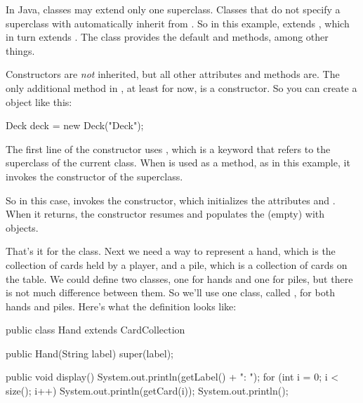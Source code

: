 

In Java, classes may extend only one superclass.
Classes that do not specify a superclass with  automatically inherit from .
So in this example,  extends , which in turn extends .
The  class provides the default  and  methods, among other things.


Constructors are {\em not} inherited, but all other  attributes and methods are.
The only additional method in , at least for now, is a constructor.
So you can create a  object like this:

\begin{code}
Deck deck = new Deck("Deck");
\end{code}

The first line of the constructor uses , which is a keyword that refers to the superclass of the current class.
When  is used as a method, as in this example, it invokes the constructor of the superclass.


So in this case,  invokes the  constructor, which initializes the attributes  and .
When it returns, the  constructor resumes and populates the (empty)  with  objects.

That's it for the  class.
Next we need a way to represent a hand, which is the collection of cards held by a player, and a pile, which is a collection of cards on the table.
We could define two classes, one for hands and one for piles, but there is not much difference between them.
So we'll use one class, called , for both hands and piles.
Here's what the definition looks like:


\begin{code}
public class Hand extends CardCollection {

    public Hand(String label) {
        super(label);
    }

    public void display() {
        System.out.println(getLabel() + ": ");
        for (int i = 0; i < size(); i++) {
            System.out.println(getCard(i));
        }
        System.out.println();
    }
}
\end{code}

